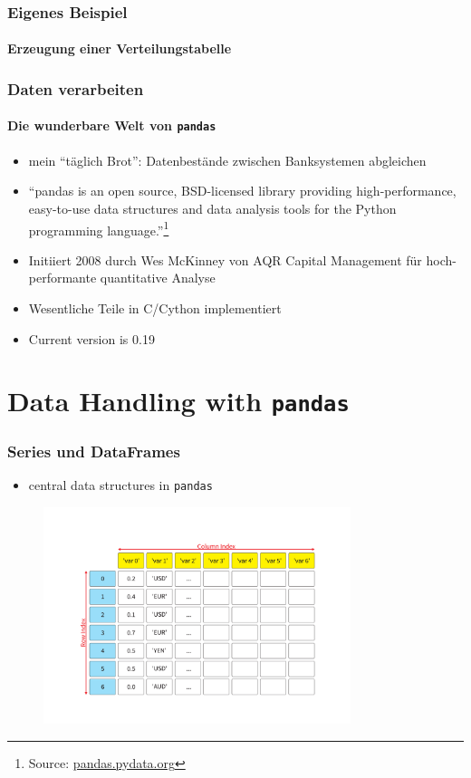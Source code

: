 \documentclass[12pt,ngerman]{beamer}
\begin{document}
\begin{frame}[fragile]
\frametitle{Eigenes Beispiel}
\framesubtitle{Erzeugung einer Verteilungstabelle}

 

\end{frame}


\begin{frame}
\frametitle{Daten verarbeiten}
\framesubtitle{Die wunderbare Welt von \texttt{pandas}}

\begin{itemize}
\item mein \enquote{täglich Brot}: Datenbestände zwischen Banksystemen abgleichen 
\item \enquote{pandas is an open source, BSD-licensed library providing high-performance, easy-to-use data structures and data analysis tools for the Python programming language.}\footnote{Source: \url{pandas.pydata.org}}
\item Initiiert 2008 durch Wes McKinney von AQR Capital Management für hoch-performante quantitative Analyse
\item Wesentliche Teile in C/Cython implementiert
\item  Current version is 0.19
\end{itemize}
\end{frame}

\section{Data Handling with \texttt{pandas}}

\begin{frame}
\frametitle{Series und DataFrames}

\begin{itemize}
	\item central data structures in \texttt{pandas}
\end{itemize}\vspace*{1em}

\begin{figure}
\begin{center}
\includegraphics[trim=50mm 55mm 45mm 55mm,width=0.8\textwidth]{Bilder/SeriesFrames.pdf}
\end{center}
\end{figure}
\end{frame}
\end{document}
